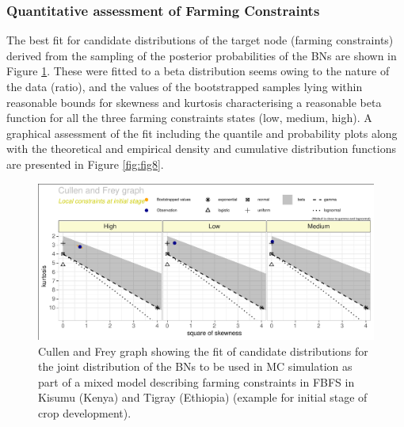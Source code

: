 \documentclass[12pt,oneside]{article}
\begin{document}
\hypertarget{II16}{%
\subsubsection{Quantitative assessment of Farming Constraints}\label{II16}}

The best fit for candidate distributions of the target node (farming constraints) derived from the sampling of the posterior probabilities of the BNs are shown in Figure \ref{fig:fig7}. These were fitted to a beta distribution seems owing to the nature of the data (ratio), and the values of the bootstrapped samples lying within reasonable bounds for skewness and kurtosis characterising a reasonable beta function for all the three farming constraints states (low, medium, high). A graphical assessment of the fit including the quantile and probability plots along with the theoretical and empirical density and cumulative distribution functions are presented in Figure \ref{fig:fig8}.

\begin{figure}[!htbp]

{\centering \includegraphics{Modelling_FBFS_Supplement_files/figure-latex/fig7-1} 

}

\caption{Cullen and Frey graph showing the fit of candidate distributions for the joint distribution of the BNs to be used in MC simulation as part of a mixed model describing farming constraints in FBFS in Kisumu (Kenya) and Tigray (Ethiopia) (example for initial stage of crop development).}\label{fig:fig7}
\end{figure}
\end{document}
